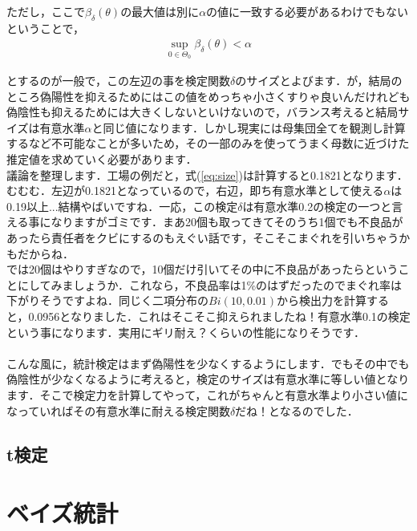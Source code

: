 \documentclass[11pt,a4paper,uplatex]{ujreport} 	%
\begin{document}
ただし，ここで$\beta_\delta(\theta)$の最大値は別に$\alpha$の値に一致する必要があるわけでもないということで，
\begin{align}
\displaystyle \sup_{0\in\Theta_0} \beta_\delta(\theta) < \alpha
\end{align}

とするのが一般で，この左辺の事を検定関数$\delta$のサイズとよびます．が，結局のところ偽陽性を抑えるためにはこの値をめっちゃ小さくすりゃ良いんだけれども偽陰性も抑えるためには大きくしないといけないので，バランス考えると結局サイズは有意水準$\alpha$と同じ値になります．しかし現実には母集団全てを観測し計算するなど不可能なことが多いため，その一部のみを使ってうまく母数に近づけた推定値を求めていく必要があります．
\\

議論を整理します．工場の例だと，式(\ref{eq:size})は計算すると0.1821となります．むむむ．左辺が0.1821となっているので，右辺，即ち有意水準として使える$\alpha$は0.19以上...結構やばいですね．一応，この検定$\delta$は有意水準0.2の検定の一つと言える事になりますがゴミです．まあ20個も取ってきてそのうち1個でも不良品があったら責任者をクビにするのもえぐい話です，そこそこまぐれを引いちゃうかもだからね．\\

では20個はやりすぎなので，10個だけ引いてその中に不良品があったらということにしてみましょうか．これなら，不良品率は1\%のはずだったのでまぐれ率は下がりそうですよね．同じく二項分布の$Bi(10,0.01)$から検出力を計算すると，0.0956となりました．これはそこそこ抑えられましたね！有意水準0.1の検定という事になります．実用にギリ耐え？くらいの性能になりそうです．\\
\\

こんな風に，統計検定はまず偽陽性を少なくするようにします．でもその中でも偽陰性が少なくなるように考えると，検定のサイズは有意水準に等しい値となります．そこで検定力を計算してやって，これがちゃんと有意水準より小さい値になっていればその有意水準に耐える検定関数$\delta$だね！となるのでした．


\section{t検定}









\newpage
\chapter{ベイズ統計}
\end{document}
